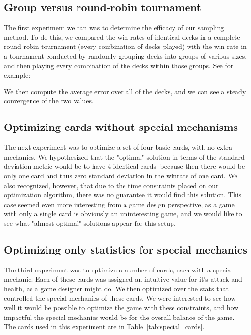 \subsection{Group versus round-robin tournament}

The first experiment we ran was to determine the efficacy of our sampling method. To do this, we compared the win rates of identical decks in a complete round robin tournament (every combination of decks played) with the win rate in a tournament conducted by randomly grouping decks into groups of various sizes, and then playing every combination of the decks within those groups. See for example:


We then compute the average error over all of the decks, and we can see a steady convergence of the two values.


 \subsection{Optimizing cards without special mechanisms}

The next experiment was to optimize a set of four basic cards, with no extra mechanics. We hypothesized that the "optimal" solution in terms of the standard deviation metric would be to have 4 identical cards, because then there would be only one card and thus zero standard deviation in the winrate of one card. We also recognized, however, that due to the time constraints placed on our optimization algorithm, there was no guarantee it would find this solution. This case seemed even more interesting from a game design perspective, as a game with only a single card is obviously an uninteresting game, and we would like to see what "almost-optimal" solutions appear for this setup.

 \subsection{Optimizing only statistics for special mechanics}

The third experiment was to optimize a number of cards, each with a special mechanic. Each of these cards was assigned an intuitive value for it's attack and health, as a game designer might do. We then optimized over the stats that controlled the special mechanics of these cards. We were interested to see how well it would be possible to optimize the game with these constraints, and how impactful the special mechanics would be for the overall balance of the game. The cards used in this experiment are in Table~\ref{tab:special_cards}.

